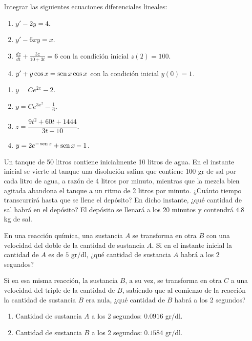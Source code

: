 
{Integrar las siguientes ecuaciones diferenciales lineales:
\begin{enumerate}
\item $y'-2y=4$.
\item $y'-6xy=x$.
\item $\frac{dz}{dt}+\frac{3z}{10+3t}=6$ con la condición inicial $z(2)=100$.
\item $y'+y\cos x=\operatorname{sen} x\cos x$ con la condición inicial $y(0)=1$.
\end{enumerate}
}
{
\begin{enumerate}
\item $y=Ce^{2x}-2$.
\item $y=Ce^{3x^2}-\frac{1}{6}$.
\item $z=\dfrac{9t^2+60t+1444}{3t+10}$.
\item $y=2e^{-\operatorname{sen} x}+\operatorname{sen} x -1$.
\end{enumerate}
}
{}


{Un tanque de 50 litros contiene inicialmente 10 litros de agua. En el instante inicial se vierte al tanque una disolución salina que
contiene 100 gr de sal por cada litro de agua, a razón de 4 litros por minuto, mientras que la mezcla bien agitada abandona el tanque a un
ritmo de 2 litros por minuto. ¿Cuánto tiempo transcurrirá hasta que se llene el depósito? En dicho instante, ¿qué cantidad de sal habrá en
el depósito?}
{El depósito se llenará a los 20 minutos y contendrá $4.8$ kg de sal. 
}
{}


{En una reacción química, una sustancia $A$ se transforma en otra $B$ con una velocidad del doble de la cantidad de
sustancia $A$.
Si en el instante inicial la cantidad de $A$ es de $5$ gr/dl, ¿qué cantidad de sustancia $A$ habrá a los 2 segundos? 

Si en esa misma reacción, la sustancia $B$, a su vez, se transforma en otra $C$ a una velocidad del triple de la
cantidad de $B$, sabiendo que al comienzo de la reacción la cantidad de sustancia $B$ era nula, ¿qué cantidad de $B$
habrá a los 2 segundos?
}
{\begin{enumerate}
\item Cantidad de sustancia $A$ a los 2 segundos: $0.0916$ gr/dl.
\item Cantidad de sustancia $B$ a los 2 segundos: $0.1584$ gr/dl.
\end{enumerate}
}
{}